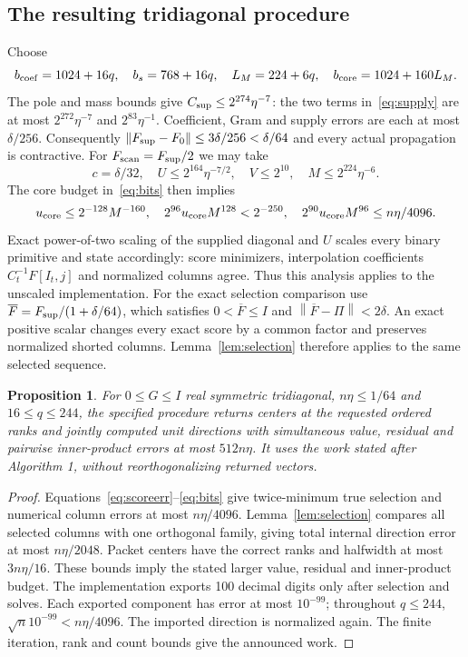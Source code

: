 \documentclass[11pt]{article}
\newtheorem{proposition}[theorem]{Proposition}
\theoremstyle{remark}\newtheorem{remark}[theorem]{Remark}
\newcommand{\norm}[1]{\left\lVert#1\right\rVert}
\begin{document}
\subsection{The resulting tridiagonal procedure}
Choose
\begin{equation}\label{eq:bits}
 b_{\rm coef}=1024+16q,\quad b_s=768+16q,\quad
 L_M=224+6q,\quad b_{\rm core}=1024+160L_M.
\end{equation}
The pole and mass bounds give $C_{\rm sup}\le2^{274}\eta^{-7}$:
the two terms in~\eqref{eq:supply} are at most $2^{272}\eta^{-7}$ and
$2^{83}\eta^{-1}$. Coefficient, Gram and supply errors are each at most
$\delta/256$. Consequently
$\norm{F_{\rm sup}-F_0}\le3\delta/256<\delta/64$ and every actual
propagation is contractive. For $F_{\rm scan}=F_{\rm sup}/2$ we may take
\[
 c=\delta/32,\quad U\le2^{164}\eta^{-7/2},\quad V\le2^{10},\quad
 M\le2^{224}\eta^{-6}.
\]
The core budget in~\eqref{eq:bits} then implies
\[
 u_{\rm core}\le2^{-128}M^{-160},\quad
 2^{96}u_{\rm core}M^{128}<2^{-250},\quad
 2^{90}u_{\rm core}M^{96}\le n\eta/4096.
\]
Exact power-of-two scaling of the supplied diagonal and $U$ scales every
binary primitive and state accordingly: score minimizers, interpolation coefficients $C_t^{-1}F[I_t,j]$
and normalized columns agree. Thus this analysis applies to the unscaled
implementation. For the exact selection comparison use
$\overline F=F_{\rm sup}/(1+\delta/64)$, which satisfies
$0<\overline F\le I$ and $\norm{\overline F-\Pi}<2\delta$.
An exact positive scalar changes every exact score by a common factor and
preserves normalized shorted columns. Lemma~\ref{lem:selection} therefore
applies to the same selected sequence.

\begin{proposition}\label{prop:gram}
For $0\le G\le I$ real symmetric tridiagonal, $n\eta\le1/64$ and
$16\le q\le244$, the specified procedure returns centers at the requested
ordered ranks and jointly computed unit directions with simultaneous value,
residual and pairwise inner-product errors at most $512n\eta$.
It uses the work stated after Algorithm 1, without reorthogonalizing returned
vectors.
\end{proposition}
\begin{proof}
Equations~\eqref{eq:scoreerr}--\eqref{eq:bits} give twice-minimum true
selection and numerical column errors at most $n\eta/4096$.
Lemma~\ref{lem:selection} compares all selected columns with one orthogonal
family, giving total internal direction error at most $n\eta/2048$.
Packet centers have the correct ranks and halfwidth at most $3n\eta/16$.
These bounds imply the stated larger value, residual and inner-product budget.
The implementation exports 100 decimal digits only after selection and solves.
Each exported component has error at most $10^{-99}$; throughout $q\le244$,
$\sqrt n10^{-99}<n\eta/4096$. The imported direction is normalized again.
The finite iteration, rank and count bounds give the announced work.
\end{proof}
\end{document}
